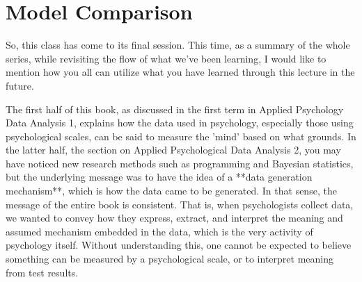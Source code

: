 \documentclass{ltjsbook}
\begin{document}
\chapter{Model Comparison}
\label{x30_comparison}
So, this class has come to its final session. This time, as a summary of the whole series, while revisiting the flow of what we've been learning, I would like to mention how you all can utilize what you have learned through this lecture in the future.

The first half of this book, as discussed in the first term in Applied Psychology Data Analysis 1, explains how the data used in psychology, especially those using psychological scales, can be said to measure the 'mind' based on what grounds.
In the latter half, the section on Applied Psychological Data Analysis 2, you may have noticed new research methods such as programming and Bayesian statistics, but the underlying message was to have the idea of a **data generation mechanism**, which is how the data came to be generated. In that sense, the message of the entire book is consistent. That is, when psychologists collect data, we wanted to convey how they express, extract, and interpret the meaning and assumed mechanism embedded in the data, which is the very activity of psychology itself. Without understanding this, one cannot be expected to believe something can be measured by a psychological scale, or to interpret meaning from test results.
\end{document}
